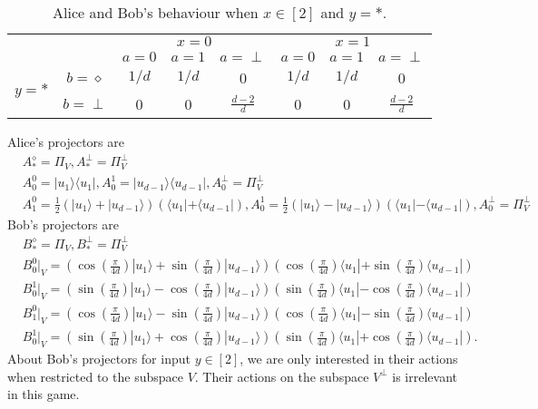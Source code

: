 \documentclass[11pt,letterpaper]{article}
\newcommand{\ket}[1]{|#1\rangle}
\newcommand{\bra}[1]{\langle#1|}
\newcommand{\ketbra}[2]{|#1\rangle\langle#2|}
\newcommand{\1}{\mathbb{1}}
\theoremstyle{definition}
\begin{document}
\begin{table}[H]
\begin{center}
\begin{tabular}{|c|c||c|c|c|c|c|c|}
\hline
\multicolumn{2}{|c|}{} &
\multicolumn{3}{|c|}{$x=0$}&
\multicolumn{3}{|c|}{$x=1$} \\
\cline{3-8}
\multicolumn{2}{|c|}{} &
$a = 0$ & $a=1$ & $a=\perp$ &
$a = 0$ & $a=1$ & $a=\perp$\\
\hline
\hline
\multirow{2}{*}{$y = \ast$} & $b=\diamond$ & $1/d$ & $1/d$ & 0 
& $1/d$ & $1/d$ & 0 \\
\cline{2-8}
&$b=\perp$ & 0 & 0 & $\frac{d-2}{d}$ 
&  0 & 0 & \small $\frac{d-2}{d} $  \\
\hline
\end{tabular}
\end{center}
\caption{Alice and Bob's behaviour when $x\in [2]$ and $y = \ast$.}
\end{table}
Alice's projectors are 
\begin{align*}
	&A_\ast^\diamond = \Pi_V, A_\ast^\perp = \Pi_V^\perp \\
	&A_0^0 = \ketbra{u_1}{u_1}, A_0^1 = \ketbra{u_{d-1}}{u_{d-1}}, A_0^\perp = \Pi_V^\perp\\
	&A_1^0 = \frac{1}{2}(\ket{u_1}+\ket{u_{d-1}})(\bra{u_1}+\bra{u_{d-1}}), 
	A_0^1 = \frac{1}{2}(\ket{u_1}-\ket{u_{d-1}})(\bra{u_1}-\bra{u_{d-1}}),A_0^\perp = \Pi_V^\perp
\end{align*}
Bob's projectors are 
\begin{align*}
	&B_\ast^\diamond = \Pi_V, B_\ast^\perp = \Pi_V^\perp \\
	&B_0^0|_V = \left( \cos(\frac{\pi}{4d})\ket{u_1} + \sin(\frac{\pi}{4d})\ket{u_{d-1}}\right)
	\left( \cos(\frac{\pi}{4d})\bra{u_1} + \sin(\frac{\pi}{4d})\bra{u_{d-1}}\right)\\
	&B_0^1|_V = \left( \sin(\frac{\pi}{4d})\ket{u_1} - \cos(\frac{\pi}{4d})\ket{u_{d-1}}\right)
	\left( \sin(\frac{\pi}{4d})\bra{u_1} - \cos(\frac{\pi}{4d})\bra{u_{d-1}}\right)\\
	&B_1^0|_V = \left( \cos(\frac{\pi}{4d})\ket{u_1} - \sin(\frac{\pi}{4d})\ket{u_{d-1}}\right)
	\left( \cos(\frac{\pi}{4d})\bra{u_1} - \sin(\frac{\pi}{4d})\bra{u_{d-1}}\right)\\
	&B_0^1|_V = \left( \sin(\frac{\pi}{4d})\ket{u_1} + \cos(\frac{\pi}{4d})\ket{u_{d-1}}\right)
	\left( \sin(\frac{\pi}{4d})\bra{u_1} + \cos(\frac{\pi}{4d})\bra{u_{d-1}}\right).
\end{align*}
About Bob's projectors for input $y \in [2]$, we are only interested in their actions when restricted 
to the subspace $V$. Their actions on the subspace $V^\perp$ is irrelevant in this game.
\end{document}
